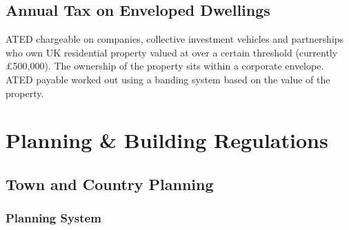 \documentclass[
]{article}
\begin{document}
\hypertarget{annual-tax-on-enveloped-dwellings}{%
\subsection{Annual Tax on Enveloped
Dwellings}\label{annual-tax-on-enveloped-dwellings}}

ATED chargeable on companies, collective investment vehicles and
partnerships who own UK residential property valued at over a certain
threshold (currently £500,000). The ownership of the property sits
within a corporate envelope. ATED payable worked out using a banding
system based on the value of the property.

\hypertarget{planning-building-regulations}{%
\section{Planning \& Building
Regulations}\label{planning-building-regulations}}

\hypertarget{town-and-country-planning}{%
\subsection{Town and Country Planning}\label{town-and-country-planning}}

\hypertarget{planning-system}{%
\subsubsection{Planning System}\label{planning-system}}
\end{document}
